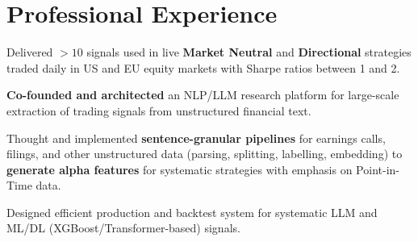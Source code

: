 \documentclass[]{deedy-resume-openfont}
\begin{document}
\sectionsep



\sectionsep
\sectionsep



\section{Professional Experience}
\sectionsep


\vspace{0.1cm}
\begin{tightemize}
	\item[\diamond] Delivered $>10$ signals used in live \textbf{Market Neutral} and \textbf{Directional} strategies traded daily in US and EU equity markets with Sharpe ratios between 1 and 2.
	\item[\diamond] \textbf{Co-founded and architected} an NLP/LLM research platform for large-scale extraction of trading signals from unstructured financial text.
	\item[\diamond] Thought and implemented \textbf{sentence-granular pipelines} for earnings calls, filings, and other unstructured data (parsing, splitting, labelling, embedding) to \textbf{generate alpha features} for systematic strategies with emphasis on Point-in-Time data.
	\item[\diamond] Designed efficient production and backtest system for systematic LLM and ML/DL (XGBoost/Transformer-based) signals.
\end{tightemize}
\end{document}
